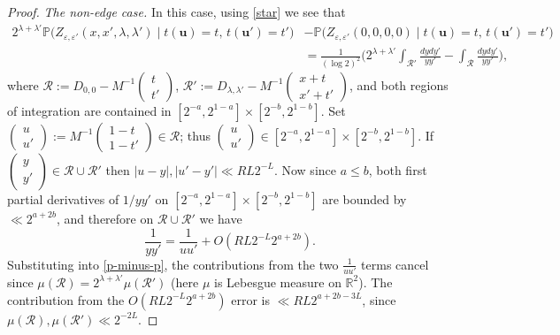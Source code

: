 \documentclass[11pt,reqno]{amsart}
\numberwithin{equation}{section}
\theoremstyle{definition}
\theoremstyle{remark}
\newcommand{\mb}{\mathbb}
\newcommand{\mbf}{\mathbf}
\newcommand{\eps}{\varepsilon}
\renewcommand{\le}{\leqslant}
\newcommand\R{\mathbb{R}}
\begin{document}
\begin{proof}
\emph{The non-edge case.} In this case, using \cref{star} we see that 
\begin{align} \nonumber 2^{\lambda + \lambda'}\mb{P}\big( Z_{\eps,\eps'}(x,x',\lambda,\lambda') \mid t(\mbf{u}) = t,\, t(\mbf{u}') = t'\big)&  - \mb{P}\big( Z_{\eps,\eps'}(0,0,0,0) \mid t(\mbf{u}) = t,\, t(\mbf{u}') = t'\big) \\ &  = \frac{1}{(\log 2)^2} \Big( 2^{\lambda + \lambda'}\int_{\mathcal{R}'} \frac{dy dy'}{y y'} - \int_{\mathcal{R}} \frac{dy dy'}{y y'}  \Big),\label{p-minus-p}\end{align}
where $\mathcal{R} := D_{0,0} - M^{-1}\left(\begin{smallmatrix} t \\ t' \end{smallmatrix} \right)$, $\mathcal{R}' := D_{\lambda,\lambda'}- M^{-1}\left(\begin{smallmatrix} x+ t \\ x'+ t' \end{smallmatrix} \right)$, and both regions of integration are contained in $[2^{-a}, 2^{1 - a}] \times [2^{-b}, 2^{1 - b}]$. Set $\left(\begin{smallmatrix} u \\ u' \end{smallmatrix} \right) := M^{-1}\left(\begin{smallmatrix} 1 - t \\ 1 - t' \end{smallmatrix}\right) \in \mathcal{R}$; thus $\left(\begin{smallmatrix} u \\ u' \end{smallmatrix} \right) \in [2^{-a}, 2^{1 - a}]\times [2^{-b}, 2^{1 - b}]$. If $\left(\begin{smallmatrix} y \\ y' \end{smallmatrix} \right) \in \mathcal{R} \cup \mathcal{R}'$ then $|u - y|, |u' - y'| \ll R L 2^{-L}$. Now since $a \le b$, both first partial derivatives of $1/yy'$ on $[2^{-a}, 2^{1 - a}] \times [2^{-b}, 2^{1 - b}]$ are bounded by $\ll 2^{a + 2b}$, and therefore on $\mathcal{R} \cup \mathcal{R}'$ we have
\[ \frac{1}{y y'} = \frac{1}{uu'} +  O(R L 2^{-L} 2^{a + 2b}).\]
Substituting into \cref{p-minus-p}, the contributions from the two $\frac{1}{uu'}$ terms cancel since $\mu(\mathcal{R}) = 2^{\lambda + \lambda'}\mu(\mathcal{R}')$ (here $\mu$ is Lebesgue measure on $\R^2$). The contribution from the $O(R L 2^{-L} 2^{a + 2b})$ error is $\ll RL 2^{a + 2b - 3L}$, since $\mu(\mathcal{R}), \mu(\mathcal{R}') \ll 2^{-2L}$.


\end{proof}
\end{document}
